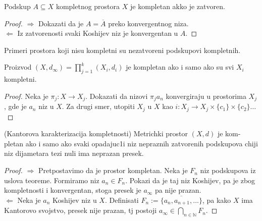 \documentclass[a4paper,12pt]{article}
\newcommand{\NN}{\mathbb{N}}
\newcommand{\psj}{\subseteq}
\begin{document}
\begin{tvr}
Podskup $A \psj X$ kompletnog prostora $X$ je kompletan akko je zatvoren.
\end{tvr}
\begin{proof}
$\boxed{\Rightarrow}$ Dokazati da je $A = \overline{A}$ preko konvergentnog niza.\\
$\boxed{\Leftarrow}$ Iz zatvorenosti svaki Koshijev niz je konvergentan u $A$.
\end{proof}

\begin{nap}
Primeri prostora koji nisu kompletni su nezatvoreni podskupovi komple\-tnih.
\end{nap}

\begin{tvr}
Proizvod $(X, d_{\infty}) = \prod_{j=1}^{k} (X_i, d_i)$ je kompletan ako i samo ako su svi $X_i$ kompletni.
\end{tvr}
\begin{proof}
Neka je $\pi_j : X \to X_j$. Dokazati da nizovi $\pi_j a_n$ konvergiraju u prostorima $X_j$, gde je $a_n$ niz u $X$. Za drugi smer, utopiti $X_j$ u $X$
	kao $i:X_j \to X_j\times \{c_1\} \times \{c_2\} \dotso$
\end{proof}

\begin{tma}
(Kantorova karakterizacija kompletnosti) Metrichki prostor $(X,d)$ je kom-pletan ako i samo ako svaki opadajuc1i niz nepraznih zatvorenih podskupova chiji niz dijametara tezi nuli ima neprazan presek.
\end{tma}
\begin{proof}
$\boxed{\Rightarrow}$ Pretpostavimo da je prostor kompletan. Neka je $F_n$ niz podskupova iz uslova teoreme. Formiramo niz $a_n \in F_n$. Pokazi da je taj niz Koshijev, pa je zbog kompletnosti i konvergentan, stoga presek je $a_{\infty}$ pa nije prazan. \\
$\boxed{\Leftarrow}$ Neka je $a_n$ Koshijev niz u $X$. Definisati $F_n := \overline{\{a_n ,a_{n+1}, ...\}}$, pa kako $X$ ima Kantorovo svojstvo, presek nije prazan, tj postoji $a_{\infty} \in \bigcap_{n \in \NN} F_n$.
\end{proof}
\end{document}
